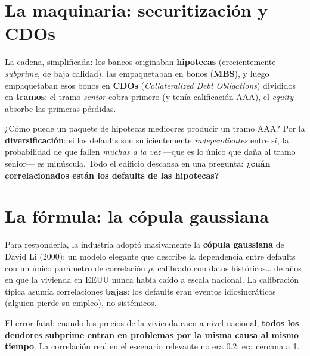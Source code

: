 \documentclass[
  spanish,
  letterpaper,
  DIV=11,
  numbers=noendperiod]{scrreprt}
\begin{document}
\section{La maquinaria: securitización y
CDOs}\label{la-maquinaria-securitizaciuxf3n-y-cdos}

La cadena, simplificada: los bancos originaban \textbf{hipotecas}
(crecientemente \emph{subprime}, de baja calidad), las empaquetaban en
bonos (\textbf{MBS}), y luego empaquetaban esos bonos en \textbf{CDOs}
(\emph{Collateralized Debt Obligations}) divididos en \textbf{tramos}:
el tramo \emph{senior} cobra primero (y tenía calificación AAA), el
\emph{equity} absorbe las primeras pérdidas.

¿Cómo puede un paquete de hipotecas mediocres producir un tramo AAA? Por
la \textbf{diversificación}: si los defaults son suficientemente
\emph{independientes} entre sí, la probabilidad de que fallen
\emph{muchas a la vez} ---que es lo único que daña al tramo senior--- es
minúscula. Todo el edificio descansa en una pregunta: \textbf{¿cuán
correlacionados están los defaults de las hipotecas?}

\section{La fórmula: la cópula
gaussiana}\label{la-fuxf3rmula-la-cuxf3pula-gaussiana}

Para responderla, la industria adoptó masivamente la \textbf{cópula
gaussiana} de David Li (2000): un modelo elegante que describe la
dependencia entre defaults con un único parámetro de correlación
\(\rho\), calibrado con datos históricos\ldots{} de años en que la
vivienda en EEUU nunca había caído a escala nacional. La calibración
típica asumía correlaciones \textbf{bajas}: los defaults eran eventos
idiosincráticos (alguien pierde su empleo), no sistémicos.

El error fatal: cuando los precios de la vivienda caen a nivel nacional,
\textbf{todos los deudores subprime entran en problemas por la misma
causa al mismo tiempo}. La correlación real en el escenario relevante no
era 0.2: era cercana a 1.
\end{document}
